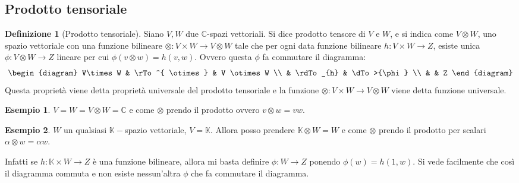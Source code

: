\documentclass[11pt]{article}
\theoremstyle{plain}
\theoremstyle{definition}
\newtheorem{defn}{Definizione}[section]
\newtheorem{exmp}{Esempio}[section]
\theoremstyle{remark}
\newcommand{\C}{\mathbb{C}}
\newcommand{\K}{\mathbb{K}}
\newcommand{\tridiag}[6]{
	  \begin{diagram}
	  #1 & \rTo^{#2}  & #3        \\
	     & \rdTo_{#6} & \dTo>{#4}   \\
	     &          & #5
	  \end{diagram}
}
\begin{document}
\subsection{Prodotto tensoriale}

\begin{defn}[Prodotto tensoriale]
   Siano $V, W$ due $\mathbb{C}$-spazi vettoriali. Si dice prodotto tensore di $V$ e $W$,
   e si indica come $V\otimes W$, uno spazio vettoriale con una funzione bilineare
   $\otimes: V \times W \to V\otimes W$ tale che per ogni data funzione bilineare $h: V\times W \to  Z$,
   esiste unica $\phi: V\otimes W \to Z$ lineare per cui $\phi(v \otimes w)=h(v,w)$. Ovvero questa $\phi$ fa commutare il diagramma:
   \[\tridiag{V\times W}{ \otimes }{V \otimes W}{\phi}{Z}{h}\]
   Questa proprietà viene detta proprietà universale del prodotto tensoriale e la funzione $\otimes: V \times W \to V\otimes W$
   viene detta funzione universale.
\label{defn:prodotto tensoriale}
\end{defn}

\begin{exmp} $V=W=V\otimes W = \C$ e come $\otimes$ prendo il prodotto ovvero $v\otimes w=vw$.
\end{exmp}
\begin{exmp} $W$ un qualsiasi $\K-$spazio vettoriale, $V=\K$. Allora posso prendere $\K\otimes W = W$ e come $\otimes$ prendo il prodotto per scalari $\alpha\otimes w=\alpha w$.

Infatti se $h:\K\times W\to Z$ è una funzione bilineare, allora mi basta definire $\phi:W\to Z$ ponendo $\phi(w) = h(1, w)$. Si vede facilmente
che così il diagramma commuta e non esiste nessun'altra $\phi$ che fa commutare il diagramma.
\end{exmp}
\end{document}
